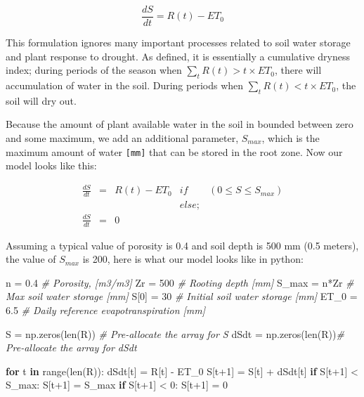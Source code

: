 \documentclass[11pt]{article}
\newenvironment{Shaded}{}{}
\newcommand{\KeywordTok}[1]{\textcolor[rgb]{0.00,0.44,0.13}{\textbf{{#1}}}}
\newcommand{\DecValTok}[1]{\textcolor[rgb]{0.25,0.63,0.44}{{#1}}}
\newcommand{\FloatTok}[1]{\textcolor[rgb]{0.25,0.63,0.44}{{#1}}}
\newcommand{\CommentTok}[1]{\textcolor[rgb]{0.38,0.63,0.69}{\textit{{#1}}}}
\newcommand{\NormalTok}[1]{{#1}}
\newcommand{\ControlFlowTok}[1]{\textcolor[rgb]{0.00,0.44,0.13}{\textbf{{#1}}}}
\newcommand{\OperatorTok}[1]{\textcolor[rgb]{0.40,0.40,0.40}{{#1}}}
\newcommand{\BuiltInTok}[1]{{#1}}
\begin{document}
\[ \frac{dS}{dt} = R(t) - ET_0 \]

This formulation ignores many important processes related to soil water
storage and plant response to drought. As defined, it is essentially a
cumulative dryness index; during periods of the season when
\(\sum_t R(t) > t \times ET_0\), there will accumulation of water in the
soil. During periods when \(\sum_t R(t) < t \times ET_0\), the soil will
dry out.

Because the amount of plant available water in the soil in bounded
between zero and some maximum, we add an additional parameter,
\(S_{max}\), which is the maximum amount of water \texttt{{[}mm{]}} that
can be stored in the root zone. Now our model looks like this:

\[
\begin{eqnarray}
    \frac{dS}{dt} &=& R(t) - ET_0 & if & (0 \leq S \leq S_{max}) \\
    & & & else; \\
    \frac{dS}{dt} &=& 0 
\end{eqnarray}       
\]

Assuming a typical value of porosity is 0.4 and soil depth is 500 mm
(0.5 meters), the value of \(S_{max}\) is 200, here is what our model
looks like in python:

\begin{Shaded}
\begin{Highlighting}[]
\NormalTok{n }\OperatorTok{=} \FloatTok{0.4}  \CommentTok{# Porosity, [m3/m3]}
\NormalTok{Zr }\OperatorTok{=} \DecValTok{500} \CommentTok{# Rooting depth [mm]}
\NormalTok{S_max }\OperatorTok{=}\NormalTok{ n}\OperatorTok{*}\NormalTok{Zr    }\CommentTok{# Max soil water storage [mm]}
\NormalTok{S[}\DecValTok{0}\NormalTok{] }\OperatorTok{=} \DecValTok{30}  \CommentTok{# Initial soil water storage [mm]}
\NormalTok{ET_0 }\OperatorTok{=} \FloatTok{6.5} \CommentTok{# Daily reference evapotranspiration [mm]}

\NormalTok{S }\OperatorTok{=}\NormalTok{ np.zeros(}\BuiltInTok{len}\NormalTok{(R)) }\CommentTok{# Pre-allocate the array for S}
\NormalTok{dSdt }\OperatorTok{=}\NormalTok{ np.zeros(}\BuiltInTok{len}\NormalTok{(R))}\CommentTok{# Pre-allocate the array for dSdt}

\ControlFlowTok{for}\NormalTok{ t }\KeywordTok{in} \BuiltInTok{range}\NormalTok{(}\BuiltInTok{len}\NormalTok{(R)):}
\NormalTok{    dSdt[t] }\OperatorTok{=}\NormalTok{ R[t] }\OperatorTok{-}\NormalTok{ ET_0}
\NormalTok{    S[t}\OperatorTok{+}\DecValTok{1}\NormalTok{] }\OperatorTok{=}\NormalTok{ S[t] }\OperatorTok{+}\NormalTok{ dSdt[t]}
    \ControlFlowTok{if}\NormalTok{ S[t}\OperatorTok{+}\DecValTok{1}\NormalTok{] }\OperatorTok{<}\NormalTok{ S_max:}
\NormalTok{        S[t}\OperatorTok{+}\DecValTok{1}\NormalTok{] }\OperatorTok{=}\NormalTok{ S_max}
    \ControlFlowTok{if}\NormalTok{ S[t}\OperatorTok{+}\DecValTok{1}\NormalTok{] }\OperatorTok{<} \DecValTok{0}\NormalTok{:}
\NormalTok{        S[t}\OperatorTok{+}\DecValTok{1}\NormalTok{] }\OperatorTok{=} \DecValTok{0}
\end{Highlighting}
\end{Shaded}
\end{document}
